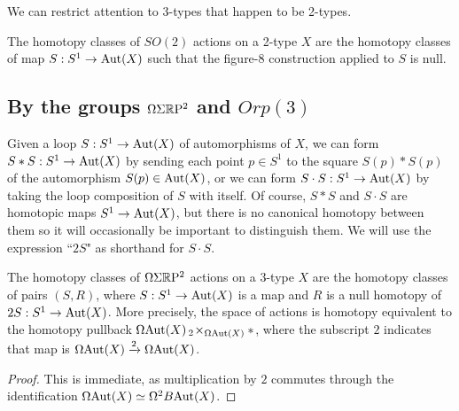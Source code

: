 \documentclass{amsart}
\begin{document}
We can restrict attention to 3-types that happen to be 2-types.
\begin{corollary}
The homotopy classes of $SO(2)$ actions on a 2-type $X$ are the homotopy classes of map $S: S^1 \rightarrow \mathrm{Aut}(X)$ such that the figure-8 construction applied to $S$ is null.
\end{corollary}

\subsection{By the groups $\Omega \Sigma \mathbb R \mathrm{P}^2$ and $Orp(3)$}

Given a loop $S: S^1 \rightarrow \mathrm{Aut}(X)$ of automorphisms of $X$, we can form $S \ast S : S^1 \rightarrow \mathrm{Aut}(X)$ by sending each point $p \in S^1$ to the square $S(p) \ast S(p)$ of the automorphism $S(p) \in \mathrm{Aut}(X)$, or we can form $S \cdot S : S^1 \rightarrow \mathrm{Aut}(X)$ by taking the loop composition of $S$ with itself.  Of course, $S \ast S$ and $S \cdot S$ are homotopic maps $S^1 \rightarrow \mathrm{Aut}(X)$, but there is no canonical homotopy between them so it will occasionally be important to distinguish them.  We will use the expression ``$2S$" as shorthand for $S \cdot S$.

\begin{prop} 
\label{prop-sigmarp2action}
The homotopy classes of $\Omega \Sigma \mathbb R \mathrm{P}^2$ actions on a 3-type $X$ are the homotopy classes of pairs $(S,R)$, where $S: S^1 \rightarrow \mathrm{Aut}(X)$ is a map and $R$ is a null homotopy of $2S: S^1 \rightarrow \mathrm{Aut}(X)$.  More precisely, the space of actions is homotopy equivalent to the homotopy pullback $\Omega \mathrm{Aut}(X) \,_2\!\times_{\Omega \mathrm{Aut}(X)} \ast$, where the subscript $2$ indicates that map is $\Omega \mathrm{Aut}(X) \xrightarrow{2} \Omega \mathrm{Aut}(X)$.
\end{prop}
\begin{proof}
This is immediate, as multiplication by $2$ commutes through the identification $\Omega \mathrm{Aut}(X) \simeq \Omega^2 B\mathrm{Aut}(X)$.
\end{proof}
\end{document}
